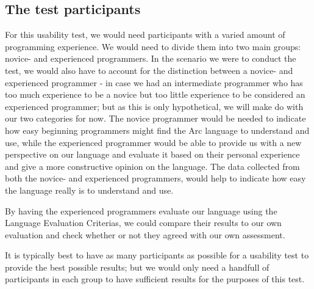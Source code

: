 \subsection{The test participants}\label{subsubsec:theTestParticipants}

For this usability test, we would need participants with a varied amount of programming experience. We would need to divide them into two main groups: novice- and experienced programmers. In the scenario we were to conduct the test, we would also have to account for the distinction between a novice- and experienced programmer - in case we had an intermediate programmer who has too much experience to be a novice but too little experience to be considered an experienced programmer; but as this is only hypothetical, we will make do with our two categories for now. The novice programmer would be needed to indicate how easy beginning programmers might find the Arc language to understand and use, while the experienced programmer would be able to provide us with a new perspective on our language and evaluate it based on their personal experience and give a more constructive opinion on the language. The data collected from both the novice- and experienced programmers, would help to indicate how easy the language really is to understand and use.

By having the experienced programmers evaluate our language using the Language Evaluation Criterias, we could compare their results to our own evaluation and check whether or not they agreed with our own assessment.

It is typically best to have as many participants as possible for a usability test to provide the best possible results; but we would only need a handfull of participants in each group to have sufficient results for the purposes of this test.



